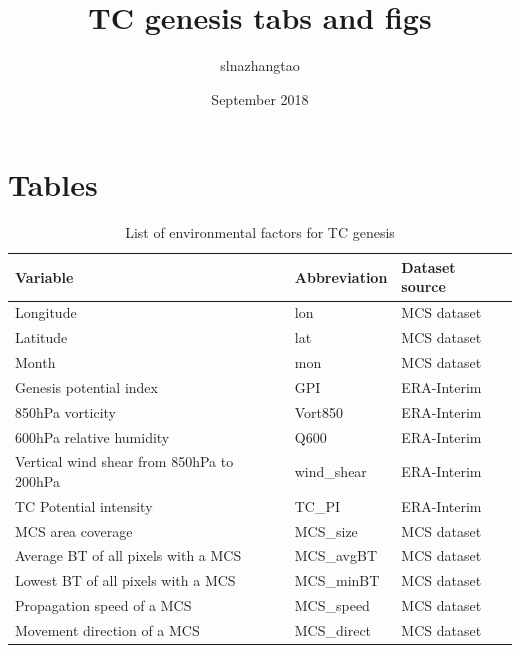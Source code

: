 \documentclass{article}
\title{TC genesis tabs and figs}
\author{slnazhangtao }
\date{September 2018}
\begin{document}
\maketitle

\section{Tables}

 \begin{table} %
 \caption{List of environmental factors for TC genesis}
 \centering
 \begin{tabular}{l l l}
 \hline
 Variable &  Abbreviation & Dataset source \\
 \hline
 Longitude                                  & lon           & MCS dataset\\
 Latitude                                   & lat           & MCS dataset\\
 Month                                      & mon           & MCS dataset\\
 Genesis potential index                    & GPI           & ERA-Interim\\
 850hPa vorticity                           & Vort850       & ERA-Interim  \\
 600hPa relative humidity                   & Q600          & ERA-Interim  \\
 Vertical wind shear from 850hPa to 200hPa  & wind\_shear   & ERA-Interim   \\
 TC Potential intensity                     & TC\_PI        & ERA-Interim\\
 MCS area coverage                          & MCS\_size     & MCS dataset\\
 Average BT of all pixels with a MCS        & MCS\_avgBT    & MCS dataset   \\
 Lowest BT of all pixels with a MCS         & MCS\_minBT    & MCS dataset  \\
 Propagation speed of a MCS                 & MCS\_speed    & MCS dataset \\
 Movement direction of a MCS                & MCS\_direct   & MCS dataset\\ 
\hline
\end{tabular}
\end{table}
\end{document}
